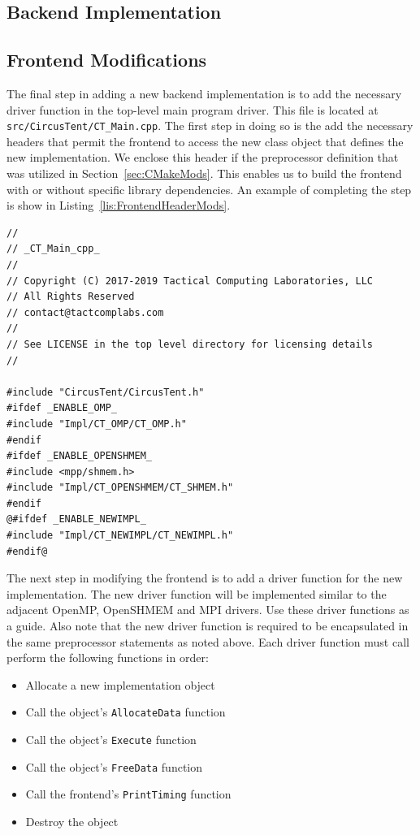 \documentclass{article}
\begin{document}
\clearpage
\subsection{Backend Implementation}
\label{sec:BackendImpl}

\clearpage
\subsection{Frontend Modifications}
\label{sec:FrontendMods}

The final step in adding a new backend implementation is to add the necessary 
driver function in the top-level main program driver.  This file is located 
at \texttt{src/CircusTent/CT\_Main.cpp}.  The first step in doing so is the add
the necessary headers that permit the frontend to access the new class object 
that defines the new implementation.  We enclose this header if the preprocessor 
definition that was utilized in Section~\ref{sec:CMakeMods}.  This enables us to build 
the frontend with or without specific library dependencies.  An example of completing 
the step is show in Listing~\ref{lis:FrontendHeaderMods}.  

\vspace{0.125in}
\begin{lstlisting}[frame=single,style=base,caption={Frontend Header Modifications},captionpos=b,label={lis:FrontendHeaderMods}]
//
// _CT_Main_cpp_
//
// Copyright (C) 2017-2019 Tactical Computing Laboratories, LLC
// All Rights Reserved
// contact@tactcomplabs.com
//
// See LICENSE in the top level directory for licensing details
//

#include "CircusTent/CircusTent.h"
#ifdef _ENABLE_OMP_
#include "Impl/CT_OMP/CT_OMP.h"
#endif
#ifdef _ENABLE_OPENSHMEM_
#include <mpp/shmem.h>
#include "Impl/CT_OPENSHMEM/CT_SHMEM.h"
#endif
@#ifdef _ENABLE_NEWIMPL_
#include "Impl/CT_NEWIMPL/CT_NEWIMPL.h"
#endif@
\end{lstlisting}

The next step in modifying the frontend is to add a driver function 
for the new implementation.  The new driver function will be implemented 
similar to the adjacent OpenMP, OpenSHMEM and MPI drivers.  Use these 
driver functions as a guide.  Also note that the new driver function is required 
to be encapsulated in the same preprocessor statements as noted above.    
Each driver function must call perform the following functions in order:

\begin{itemize}
\item Allocate a new implementation object
\item Call the object's \texttt{AllocateData} function
\item Call the object's \texttt{Execute} function
\item Call the object's \texttt{FreeData} function
\item Call the frontend's \texttt{PrintTiming} function
\item Destroy the object
\end{itemize}
\end{document}
